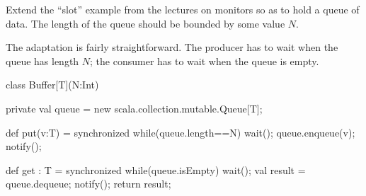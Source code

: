 \begin{question}
Extend the ``slot'' example from the lectures on monitors so as
to hold a queue of data.  The length of the queue should be bounded by some
value $N$.
\end{question}


\begin{answer}
The adaptation is fairly straightforward.  The producer has to wait when the
queue has length $N$; the consumer has to wait when the queue is empty.
%
\begin{scala}
class Buffer[T](N:Int){
  private val queue = new scala.collection.mutable.Queue[T];

  def put(v:T) = synchronized{
    while(queue.length==N) wait();
    queue.enqueue(v); 
    notify();
  }

  def get : T = synchronized{
    while(queue.isEmpty) wait();
    val result = queue.dequeue;
    notify();
    return result;
  }
}
\end{scala}
%
\end{answer}

